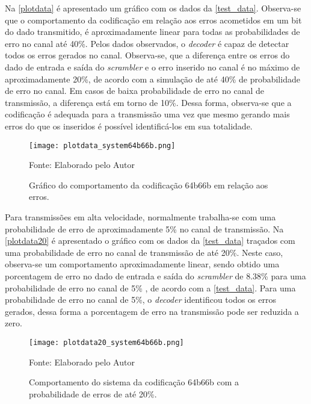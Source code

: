 Na \autoref{plotdata} é apresentado um gráfico com os dados da \autoref{test_data}. Observa-se que o comportamento da codificação em relação aos erros acometidos em um bit do dado transmitido, é aproximadamente linear para todas as probabilidades de erro no canal até 40\%. Pelos dados observados, o \textit{decoder} é capaz de detectar todos os erros gerados no canal. Observa-se, que a diferença entre os erros do dado de entrada e saída do \textit{scrambler} e o erro inserido no canal é no máximo de aproximadamente 20\%, de acordo com a simulação de até 40\% de probabilidade de erro no canal. Em casos de baixa probabilidade de erro no canal de transmissão, a diferença está em torno de 10\%. Dessa forma, observa-se que a codificação é adequada para a transmissão uma vez que mesmo gerando mais erros do que os inseridos é possível identificá-los em sua totalidade.

\begin{figure}[H]
	\caption{\label{plotdata} Gráfico do comportamento da codificação 64b66b em relação aos erros.}
	\centering
	\texttt{[image: plotdata\_system64b66b.png]}
	\begin{center}
		Fonte: Elaborado pelo Autor
	\end{center}	
\end{figure}

Para transmissões em alta velocidade, normalmente trabalha-se com uma probabilidade de erro de aproximadamente 5\% no canal de transmissão. Na \autoref{plotdata20} é apresentado o gráfico com os dados da \autoref{test_data} traçados com uma probabilidade de erro no canal de transmissão de até 20\%. Neste caso, observa-se um comportamento aproximadamente linear, sendo obtido uma porcentagem de erro no dado de entrada e saída do \textit{scrambler} de 8.38\% para uma probabilidade de erro no canal de 5\% , de acordo com a \autoref{test_data}. Para uma probabilidade de erro no canal de 5\%, o \textit{decoder} identificou todos os erros gerados, dessa forma a porcentagem de erro na transmissão pode ser reduzida a zero.

\begin{figure}[H]
	\caption{\label{plotdata20} Comportamento do sistema da codificação 64b66b com a probabilidade de erros de até 20\%.}
	\centering
	\texttt{[image: plotdata20\_system64b66b.png]}
	\begin{center}
		Fonte: Elaborado pelo Autor
	\end{center}	
\end{figure}

